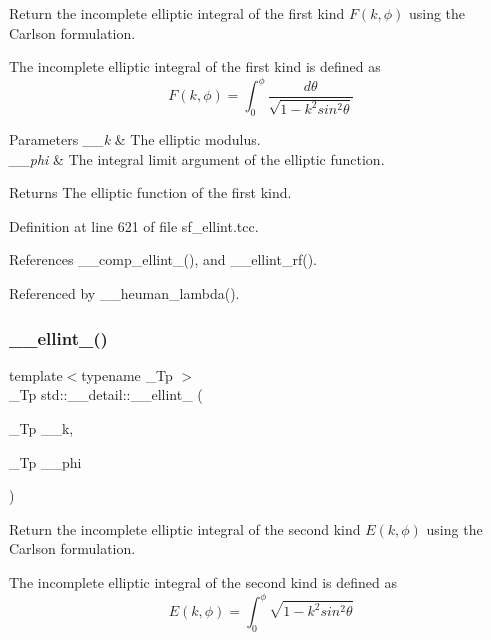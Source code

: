 Return the incomplete elliptic integral of the first kind $ F(k,\phi) $ using the Carlson formulation. 

The incomplete elliptic integral of the first kind is defined as \[ F(k,\phi) = \int_0^{\phi}\frac{d\theta} {\sqrt{1 - k^2 sin^2\theta}} \]


\begin{DoxyParams}{Parameters}
{\em \+\_\+\+\_\+k} & The elliptic modulus. \\
\hline
{\em \+\_\+\+\_\+phi} & The integral limit argument of the elliptic function. \\
\hline
\end{DoxyParams}
\begin{DoxyReturn}{Returns}
The elliptic function of the first kind. 
\end{DoxyReturn}


Definition at line 621 of file sf\+\_\+ellint.\+tcc.



References \+\_\+\+\_\+comp\+\_\+ellint\+\_(), and \+\_\+\+\_\+ellint\+\_\+rf().



Referenced by \+\_\+\+\_\+heuman\+\_\+lambda().

\mbox{\label{namespacestd_1_1____detail_ad3687a38e74e5fbf08265501add0b56a}} 
\subsubsection{\texorpdfstring{\+\_\+\+\_\+ellint\+\_()}{\_\_ellint\_2()}}
{\footnotesize\ttfamily template$<$typename \+\_\+\+Tp $>$ \\
\+\_\+\+Tp std\+::\+\_\+\+\_\+detail\+::\+\_\+\+\_\+ellint\+\_ (\begin{DoxyParamCaption}\item[{\+\_\+\+Tp}]{\+\_\+\+\_\+k,  }\item[{\+\_\+\+Tp}]{\+\_\+\+\_\+phi }\end{DoxyParamCaption})}



Return the incomplete elliptic integral of the second kind $ E(k,\phi) $ using the Carlson formulation. 

The incomplete elliptic integral of the second kind is defined as \[ E(k,\phi) = \int_0^{\phi} \sqrt{1 - k^2 sin^2\theta} \]


